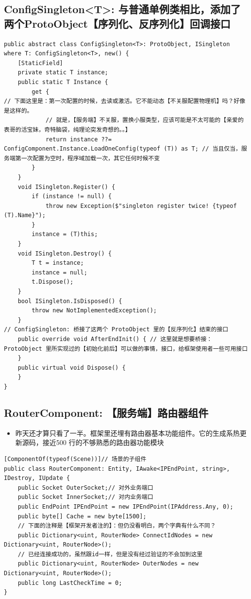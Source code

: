 \documentclass[9pt, b5paper]{article}
\begin{document}
\subsection{ConfigSingleton<T>: 与普通单例类相比，添加了两个ProtoObject【序列化、反序列化】回调接口}
\label{sec:org432d396}
\begin{verbatim}
public abstract class ConfigSingleton<T>: ProtoObject, ISingleton where T: ConfigSingleton<T>, new() {
    [StaticField]
    private static T instance;
    public static T Instance {
        get {
// 下面这里是：第一次配置的时候，去读或激活。它不能动态【不关服配置物理机】吗？好像是这样的。
            // 就是，【服务端】不关服，置换小服类型，应该可能是不太可能的【亲爱的表哥的活宝妹，奇特脑袋，纯理论突发奇想的。。】
            return instance ??= ConfigComponent.Instance.LoadOneConfig(typeof (T)) as T; // 当且仅当，服务端第一次配置为空时，程序域加载一次，其它任何时候不变
        }
    }
    void ISingleton.Register() {
        if (instance != null) {
            throw new Exception($"singleton register twice! {typeof (T).Name}");
        }
        instance = (T)this;
    }
    void ISingleton.Destroy() {
        T t = instance;
        instance = null;
        t.Dispose();
    }
    bool ISingleton.IsDisposed() {
        throw new NotImplementedException();
    }
// ConfigSingleton: 桥接了这两个 ProtoObject 里的【反序列化】结束的接口        
    public override void AfterEndInit() { // 这里就是想要桥接：ProtoObject 里所实现过的【初始化前后】可以做的事情，接口，给框架使用者一些可用接口
    }
    public virtual void Dispose() {
    }
}
\end{verbatim}
\subsection{RouterComponent: 【服务端】路由器组件}
\label{sec:org489ade4}
\begin{itemize}
\item 昨天还才算只看了一半。框架里还埋有路由器基本功能组件。它的生成系热更新源码，接近500 行的不够熟悉的路由器功能模块
\end{itemize}
\begin{verbatim}
[ComponentOf(typeof(Scene))]// 场景的子组件
public class RouterComponent: Entity, IAwake<IPEndPoint, string>, IDestroy, IUpdate {
    public Socket OuterSocket;// 对外业务端口
    public Socket InnerSocket;// 对内业务端口
    public EndPoint IPEndPoint = new IPEndPoint(IPAddress.Any, 0);
    public byte[] Cache = new byte[1500];
    // 下面的注释是【框架开发者注的】：但仍没看明白，两个字典有什么不同？
    public Dictionary<uint, RouterNode> ConnectIdNodes = new Dictionary<uint, RouterNode>();
    // 已经连接成功的，虽然跟id一样，但是没有经过验证的不会加到这里
    public Dictionary<uint, RouterNode> OuterNodes = new Dictionary<uint, RouterNode>();
    public long LastCheckTime = 0;
}
\end{verbatim}
\end{document}

